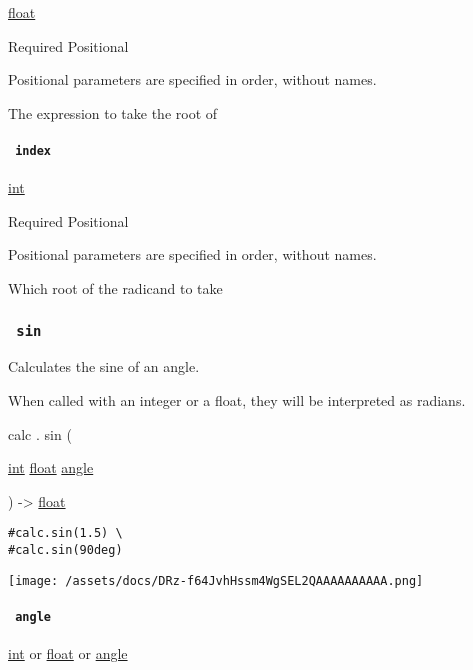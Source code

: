 \href{/docs/reference/foundations/float/}{float}

{Required} {{ Positional }}

\label{functions-root-radicand-positional-tooltip}
Positional parameters are specified in order, without names.

The expression to take the root of

\paragraph{\texorpdfstring{\texttt{\ index\ }}{ index }}\label{functions-root-index}

\href{/docs/reference/foundations/int/}{int}

{Required} {{ Positional }}

\label{functions-root-index-positional-tooltip}
Positional parameters are specified in order, without names.

Which root of the radicand to take

\subsubsection{\texorpdfstring{\texttt{\ sin\ }}{ sin }}\label{functions-sin}

Calculates the sine of an angle.

When called with an integer or a float, they will be interpreted as
radians.

calc { . } { sin } (

{ \href{/docs/reference/foundations/int/}{int}
\href{/docs/reference/foundations/float/}{float}
\href{/docs/reference/layout/angle/}{angle} }

) -\textgreater{} \href{/docs/reference/foundations/float/}{float}

\begin{verbatim}
#calc.sin(1.5) \
#calc.sin(90deg)
\end{verbatim}

\texttt{[image: /assets/docs/DRz-f64JvhHssm4WgSEL2QAAAAAAAAAA.png]}

\paragraph{\texorpdfstring{\texttt{\ angle\ }}{ angle }}\label{functions-sin-angle}

\href{/docs/reference/foundations/int/}{int} {or}
\href{/docs/reference/foundations/float/}{float} {or}
\href{/docs/reference/layout/angle/}{angle}

